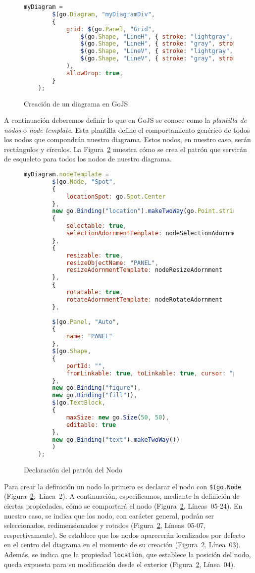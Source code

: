 \begin{figure}[!tb]
	\centering
	\begin{lstlisting}[language=JavaScript]
	myDiagram =
		$(go.Diagram, "myDiagramDiv",
		{
			grid: $(go.Panel, "Grid",
				$(go.Shape, "LineH", { stroke: "lightgray", strokeWidth: 0.5 }),
				$(go.Shape, "LineH", { stroke: "gray", strokeWidth: 0.5, interval: 10 }),
				$(go.Shape, "LineV", { stroke: "lightgray", strokeWidth: 0.5 }),
				$(go.Shape, "LineV", { stroke: "gray", strokeWidth: 0.5, interval: 10 })
			),
			allowDrop: true,
		}
	);\end{lstlisting}
	\caption{Creación de un diagrama en GoJS}
	\label{fig:creacionDiagrama}
\end{figure}

A continuación deberemos definir lo que en GoJS se conoce como la \emph{plantilla de nodos} o \emph{node template}. Esta plantilla define el comportamiento genérico de todos los nodos que compondrán nuestro diagrama. Estos nodos, en nuestro caso, serán rectángulos y círculos. La Figura~\ref{fig:patronNodo} muestra cómo se crea el patrón que servirán de esqueleto para todos los nodos de nuestro diagrama. 

\begin{figure}[!tb]
	\centering
	\begin{lstlisting}[language=JavaScript]
	myDiagram.nodeTemplate =
		$(go.Node, "Spot",
		{ 
			locationSpot: go.Spot.Center 
		},
		new go.Binding("location").makeTwoWay(go.Point.stringify),
		{ 
			selectable: true, 
			selectionAdornmentTemplate: nodeSelectionAdornment 
		},
		{ 
			resizable: true, 
			resizeObjectName: "PANEL", 
			resizeAdornmentTemplate: nodeResizeAdornment 
		},
		{ 
			rotatable: true, 
			rotateAdornmentTemplate: nodeRotateAdornment 
		},
	
		$(go.Panel, "Auto",
		{ 
			name: "PANEL" 
		},
		$(go.Shape,
		{
			portId: "",
			fromLinkable: true, toLinkable: true, cursor: "pointer",
		},
		new go.Binding("figure"),
		new go.Binding("fill")),
		$(go.TextBlock,
		{
			maxSize: new go.Size(50, 50),
			editable: true
		},
		new go.Binding("text").makeTwoWay())
		)
	);\end{lstlisting}
\caption{Declaración del patrón del Nodo}
\label{fig:patronNodo}
\end{figure}

Para crear la definición un nodo lo primero es declarar el nodo con \texttt{\$(go.Node} (Figura~\ref{fig:patronNodo},~Línea~2).
A continuación, especificamos, mediante la definición de ciertas propiedades, cómo se comportará el nodo (Figura~\ref{fig:patronNodo}, Líneas~05-24). En nuestro caso, se indica que los nodo, con carácter general, podrán ser seleccionados, redimensionados y rotados (Figura~\ref{fig:patronNodo}, Líneas~05-07, respectivamente). Se establece que los nodos aparecerán localizados por defecto en el centro del diagrama en el momento de su creación (Figura~\ref{fig:patronNodo}, Línea~03).
Además, se indica que la propiedad \texttt{location}, que establece la posición del nodo, queda expuesta para su modificación desde el exterior (Figura~\ref{fig:patronNodo}, Línea~04).

